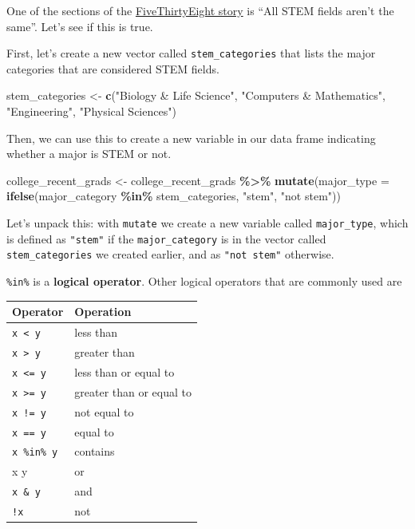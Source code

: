 \documentclass[
]{article}
\newenvironment{Shaded}{\begin{snugshade}}{\end{snugshade}}
\newcommand{\AttributeTok}[1]{\textcolor[rgb]{0.13,0.29,0.53}{#1}}
\newcommand{\FunctionTok}[1]{\textcolor[rgb]{0.13,0.29,0.53}{\textbf{#1}}}
\newcommand{\NormalTok}[1]{#1}
\newcommand{\OtherTok}[1]{\textcolor[rgb]{0.56,0.35,0.01}{#1}}
\newcommand{\SpecialCharTok}[1]{\textcolor[rgb]{0.81,0.36,0.00}{\textbf{#1}}}
\newcommand{\StringTok}[1]{\textcolor[rgb]{0.31,0.60,0.02}{#1}}
\begin{document}
One of the sections of the
\href{https://fivethirtyeight.com/features/the-economic-guide-to-picking-a-college-major/}{FiveThirtyEight
story} is ``All STEM fields aren't the same''. Let's see if this is
true.

First, let's create a new vector called \texttt{stem\_categories} that
lists the major categories that are considered STEM fields.

\begin{Shaded}
\begin{Highlighting}[]
\NormalTok{stem\_categories }\OtherTok{\textless{}{-}} \FunctionTok{c}\NormalTok{(}\StringTok{"Biology \& Life Science"}\NormalTok{,}
                     \StringTok{"Computers \& Mathematics"}\NormalTok{,}
                     \StringTok{"Engineering"}\NormalTok{,}
                     \StringTok{"Physical Sciences"}\NormalTok{)}
\end{Highlighting}
\end{Shaded}

Then, we can use this to create a new variable in our data frame
indicating whether a major is STEM or not.

\begin{Shaded}
\begin{Highlighting}[]
\NormalTok{college\_recent\_grads }\OtherTok{\textless{}{-}}\NormalTok{ college\_recent\_grads }\SpecialCharTok{\%\textgreater{}\%}
  \FunctionTok{mutate}\NormalTok{(}\AttributeTok{major\_type =} \FunctionTok{ifelse}\NormalTok{(major\_category }\SpecialCharTok{\%in\%}\NormalTok{ stem\_categories, }\StringTok{"stem"}\NormalTok{, }\StringTok{"not stem"}\NormalTok{))}
\end{Highlighting}
\end{Shaded}

Let's unpack this: with \texttt{mutate} we create a new variable called
\texttt{major\_type}, which is defined as \texttt{"stem"} if the
\texttt{major\_category} is in the vector called
\texttt{stem\_categories} we created earlier, and as
\texttt{"not\ stem"} otherwise.

\texttt{\%in\%} is a \textbf{logical operator}. Other logical operators
that are commonly used are

\begin{longtable}[]{@{}ll@{}}
\toprule\noalign{}
Operator & Operation \\
\midrule\noalign{}
\endhead
\bottomrule\noalign{}
\endlastfoot
\texttt{x\ \textless{}\ y} & less than \\
\texttt{x\ \textgreater{}\ y} & greater than \\
\texttt{x\ \textless{}=\ y} & less than or equal to \\
\texttt{x\ \textgreater{}=\ y} & greater than or equal to \\
\texttt{x\ !=\ y} & not equal to \\
\texttt{x\ ==\ y} & equal to \\
\texttt{x\ \%in\%\ y} & contains \\
x \textbar{} y & or \\
\texttt{x\ \&\ y} & and \\
\texttt{!x} & not \\
\end{longtable}
\end{document}
